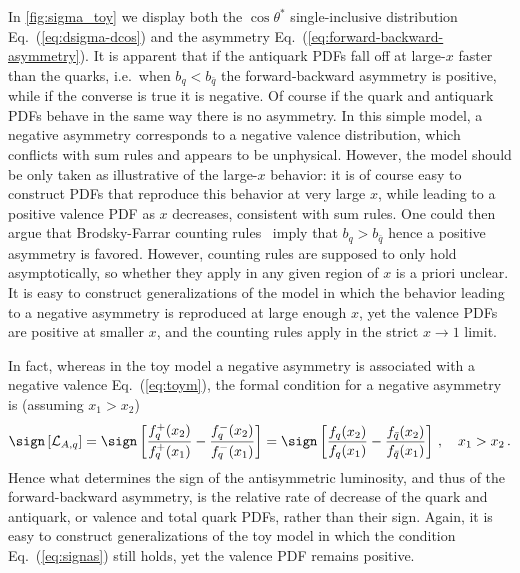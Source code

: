 In \cref{fig:sigma_toy} we display both the $\cos\theta^*$
single-inclusive distribution Eq.~(\ref{eq:dsigma-dcos}) and
the asymmetry Eq.~(\ref{eq:forward-backward-asymmetry}).
%
It is apparent that if the  antiquark PDFs fall off at large-$x$ faster than
the quarks, i.e.\ when $b_q < b_{\bar{q}}$ the forward-backward
asymmetry is positive, while if the converse is true it is
negative. Of course if the quark and antiquark PDFs behave in the same
way there is no asymmetry.
%
In this simple model, a negative asymmetry corresponds to a negative
valence distribution, which conflicts with sum rules and appears to be
unphysical. However, the model should be only taken as illustrative of
the large-$x$ behavior: it is of course easy to construct PDFs that
reproduce this behavior at very large $x$, while leading to a positive
valence PDF as $x$ decreases, consistent with sum rules. One could then argue that
Brodsky-Farrar counting rules~\cite{Brodsky:1973kr,Brodsky:1974vy}
imply that  $b_q > b_{\bar{q}}$
hence a positive asymmetry is favored.
%
However,
counting rules are supposed to only hold asymptotically, so whether
they apply in any given region of $x$ is a priori unclear.
%
It is easy
to construct generalizations of the model in which the behavior
leading to a negative asymmetry is reproduced at large enough $x$, yet
the valence PDFs are positive at smaller $x$, and the counting rules
apply in the strict $x\to1$ limit.

In fact, whereas in the toy model a negative asymmetry is
associated with a negative valence
Eq.~(\ref{eq:toym}), the formal condition for a negative asymmetry is
(assuming $x_1>x_2$)
\begin{equation}\label{eq:signas}
   \sign\left[\mathcal{L}_{A,q}\right]=\sign\left[\frac{ f_q^+(x_2)}{
       f_q^+(x_1)}-\frac{
       f_q^-(x_2)}{f_q^-(x_1)}\right]=\sign\left[\frac{ f_q(x_2)}{
       f_q(x_1)}-\frac{f_{\bar{q}}(x_2)}{f_{\bar{q}}(x_1)}\right] \, , \quad x_1>x_2 \,.
\end{equation}
Hence what determines the sign of the antisymmetric luminosity, and thus
of the forward-backward asymmetry, is the relative rate of decrease of
the quark and antiquark, or valence and total quark PDFs, rather than
their sign. Again, it is easy to construct generalizations of the
toy model in which the condition Eq.~(\ref{eq:signas}) still holds,  yet
the valence PDF remains positive.

